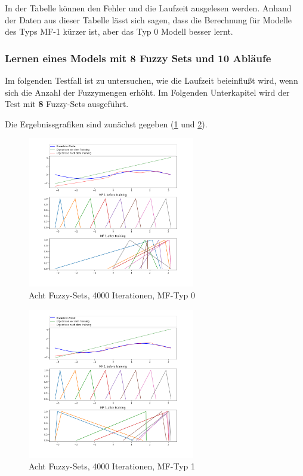 {In der Tabelle können den Fehler und die Laufzeit ausgelesen werden. Anhand der Daten aus dieser Tabelle lässt sich sagen, dass die Berechnung für Modelle des Typs MF-1 kürzer ist, aber das Typ 0 Modell besser lernt.

\subsubsection{Lernen eines Models mit 8 Fuzzy Sets und 10 Abläufe}\label{m8fs10ab}
Im folgenden Testfall ist zu untersuchen, wie die Laufzeit beieinflußt wird, wenn sich die Anzahl der Fuzzymengen erhöht. Im Folgenden Unterkapitel wird der Test mit \textbf{8} Fuzzy-Sets ausgeführt.

Die Ergebnissgrafiken sind zunächst gegeben (\ref{8Sets4000_Stoch_0} und \ref{8Sets4000_Stoch_1}).

\begin{figure}[htbp]
	\centering
	\includegraphics[width=0.65\textwidth]{images/sinus/Stochastic/sinus 1 Input 8 Sets 4000 Epochs Stochastic Gradient Descent two equations mf.png}
	\caption{Acht Fuzzy-Sets, 4000 Iterationen, MF-Typ 0} \label{8Sets4000_Stoch_0}
\end{figure}
\begin{figure}[htbp]
	\centering
	\includegraphics[width=0.65\textwidth]{images/sinus/Stochastic/sinus 1 Input 8 Sets 4000 Epochs Stochastic Gradient Descent one equation mf.png}
	\caption{Acht Fuzzy-Sets, 4000 Iterationen, MF-Typ 1} \label{8Sets4000_Stoch_1}
\end{figure}

}
